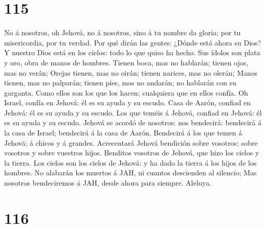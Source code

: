 \hypertarget{section-114}{%
\section{115}\label{section-114}}

 No á nosotros, oh Jehová, no á nosotros, sino á tu nombre
da gloria; por tu misericordia, por tu verdad.  Por qué
dirán las gentes: ¿Dónde está ahora su Dios?  Y nuestro
Dios está en los cielos: todo lo que quiso ha hecho.  Sus
ídolos son plata y oro, obra de manos de hombres.  Tienen
boca, mas no hablarán; tienen ojos, mas no verán;  Orejas
tienen, mas no oirán; tienen narices, mas no olerán; 
Manos tienen, mas no palparán; tienen pies, mas no andarán; no hablarán
con su garganta.  Como ellos son los que los hacen;
cualquiera que en ellos confía.  Oh Israel, confía en
Jehová: él es su ayuda y su escudo.  Casa de Aarón,
confiad en Jehová: él es su ayuda y su escudo.  Los que
teméis á Jehová, confiad en Jehová: él es su ayuda y su escudo.
 Jehová se acordó de nosotros: nos bendecirá: bendecirá á
la casa de Israel; bendecirá á la casa de Aarón. 
Bendecirá á los que temen á Jehová; á chicos y á grandes.
 Acrecentará Jehová bendición sobre vosotros; sobre
vosotros y sobre vuestros hijos.  Benditos vosotros de
Jehová, que hizo los cielos y la tierra.  Los cielos son
los cielos de Jehová: y ha dado la tierra á los hijos de los hombres.
 No alabarán los muertos á JAH, ni cuantos descienden al
silencio;  Mas nosotros bendeciremos á JAH, desde ahora
para siempre. Aleluya.

\hypertarget{section-115}{%
\section{116}\label{section-115}}

